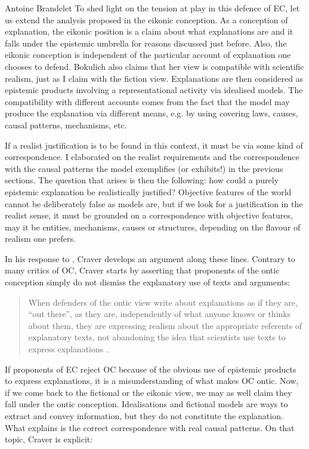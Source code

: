 \begin{artengenv}{Antoine Brandelet}
To shed light on the tension at play in this defence of EC, let us extend the analysis proposed in the eikonic conception. As a conception of explanation, the eikonic position is a claim about what explanations are and it falls under the epistemic umbrella for reasons discussed just before. Also, the eikonic conception is independent of the particular account of explanation one chooses to defend. Bokulich also claims that her view is compatible with scientific realism, just as I claim with the fiction view. Explanations are then considered as epistemic products involving a representational activity via idealised models. The compatibility with different accounts comes from the fact that the model may produce the explanation via different means, e.g. by using covering laws, causes, causal patterns, mechanisms, etc.

If a realist justification is to be found in this context, it must be via some kind of correspondence. I elaborated on the realist requirements and the correspondence with the causal patterns the model exemplifies (or exhibits!) in the previous sections. The question that arises is then the following: how could a purely epistemic explanation be realistically justified? Objective features of the world cannot be deliberately false as models are, but if we look for a justification in the realist sense, it must be grounded on a correspondence with objective features, may it be entities, mechanisms, causes or structures, depending on the flavour of realism one prefers.

In his response to \parencite{Bokulich2016}, Craver develops an argument along these lines. Contrary to many critics of OC, Craver starts by asserting that proponents of the ontic conception simply do not dismiss the explanatory use of texts and arguments:

\begin{quote}
    When defenders of the ontic view write about explanations as if they are, ``out there”, as they are, independently of what anyone knows or thinks about them, they are expressing realism about the appropriate referents of explanatory texts, not abandoning the idea that scientists use texts to express explanations \parencite{Craver2019}.
\end{quote}

If proponents of EC reject OC because of the obvious use of epistemic products to express explanations, it is a misunderstanding of what makes OC ontic. Now, if we come back to the fictional or the eikonic view, we may as well claim they fall under the ontic conception. Idealisations and fictional models are ways to extract and convey information, but they do not constitute the explanation. What explains is the correct correspondence with real causal patterns. On that topic, Craver is explicit:


\end{artengenv}
